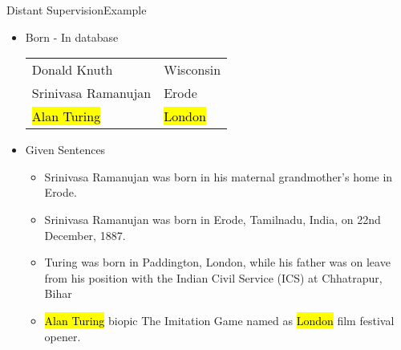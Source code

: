 \documentclass{beamer}
\makeatletter
\newcommand\SoulColor{%
  \let\set@color\beamerorig@set@color
  \let\reset@color\beamerorig@reset@color}
\makeatother
\begin{document}
\begin{frame}{Distant Supervision}{Example}
\begin{itemize}
 
\item Born - In database
 \begin{center}
\begin{tabular}{|l|l|}
\hline
Donald Knuth & Wisconsin \\
Srinivasa Ramanujan & Erode \\
\SoulColor\hl{Alan Turing} & \SoulColor\hl{London} \\
\hline
\end{tabular}
\end{center}
\item Given Sentences
\begin{itemize}
\item Srinivasa Ramanujan was born in his maternal grandmother’s home in Erode.
\item Srinivasa Ramanujan was born in Erode, Tamilnadu, India, on 22nd December, 1887.
\item Turing was born in Paddington, London, while his father was on leave from his position with the Indian Civil Service (ICS) at Chhatrapur, Bihar
\item \alert<+> {\SoulColor\hl{Alan Turing} biopic The Imitation Game named as \SoulColor\hl{London} film festival opener.}
\end{itemize}
\end{itemize}
 
\end{frame}
\end{document}
